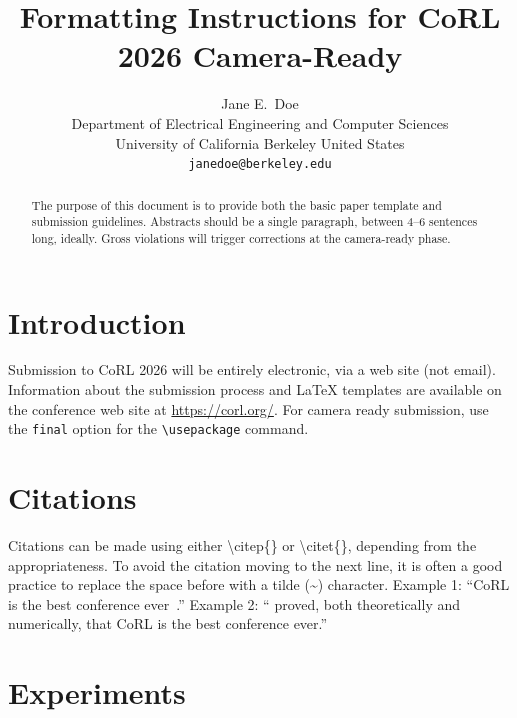\documentclass{article}
\title{Formatting Instructions for CoRL 2026 Camera-Ready}
\author{
  Jane E.~Doe\\
  Department of Electrical Engineering and Computer Sciences\\
  University of California Berkeley 
  United States\\
  \texttt{janedoe@berkeley.edu} \\
}
\begin{document}
\maketitle


\begin{abstract}
    The purpose of this document is to provide both the basic paper template and submission guidelines. Abstracts should be a single paragraph, between 4--6 sentences long, ideally. Gross violations will trigger corrections at the camera-ready phase.
\end{abstract}



\section{Introduction}
	
    Submission to CoRL 2026 will be entirely electronic, via a web site (not email). Information about the submission process and \LaTeX{} templates are available on the conference web site at \url{https://corl.org/}. For camera ready submission, use the \texttt{final} option for the \texttt{\textbackslash usepackage} command. 


\section{Citations}
\label{sec:citations}

	Citations can be made using either \textbackslash citep\{\} or \textbackslash citet\{\}, depending from the appropriateness. To avoid the citation moving to the next line, it is often a good practice to replace the space before with a tilde (\~{}) character.
	Example 1: ``CoRL is the best conference ever~\citep{Gauss1857}.''
	Example 2: ``\citet{Lagrange1788} proved, both theoretically and numerically, that CoRL is the best conference ever.''
	

\section{Experiments}
\label{sec:result}
\end{document}
